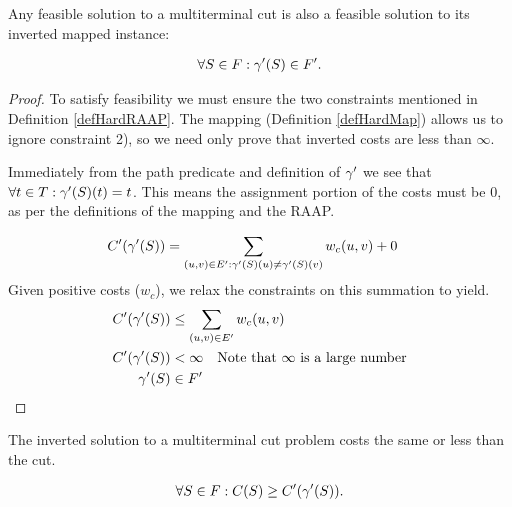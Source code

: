 \begin{lemma}
\label{INVERSEFEASIBLE}
Any feasible solution to a multiterminal cut is also a feasible solution to its inverted mapped instance:

\begin{align}
	\nonumber \forall S \in F : \gamma'(S) \in F'.
\end{align}
\end{lemma}

\begin{proof}
To satisfy feasibility we must ensure the two constraints mentioned in Definition \ref{defHardRAAP}.
The mapping (Definition \ref{defHardMap}) allows us to ignore constraint 2), so we need only prove that inverted costs are less than $\infty$.

Immediately from the path predicate and definition of $\gamma'$ we see that $\forall t \in T : \gamma'(S)(t) = t$.
This means the assignment portion of the costs must be 0, as per the definitions of the mapping and the RAAP.

\begin{align}
	\nonumber C'(\gamma'(S)) & = \displaystyle\sum\limits_{(u,v) \in E' : \gamma'(S)(u) \neq \gamma'(S)(v)} w_c(u,v) + 0
\end{align}
\noindent Given positive costs ($w_c$), we relax the constraints on this summation to yield.
\begin{align}
	\nonumber C'(\gamma'(S)) & \leq \displaystyle\sum\limits_{(u,v) \in E'} w_c(u,v) \\
	\nonumber C'(\gamma'(S)) & < \infty \quad \mbox{Note that $\infty$ is a large number}\\
	\nonumber \gamma'(S) & \in F'
\end{align}
\end{proof}

\begin{lemma}
\label{INVERSECOST}
The inverted solution to a multiterminal cut problem costs the same or less than the cut.

\begin{align}
	\nonumber \forall S \in F : C(S) \geq C'(\gamma'(S)).
\end{align}
\end{lemma}

